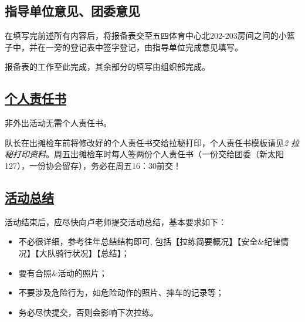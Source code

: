 \documentclass[UTF8]{ctexart}
\begin{document}
\subsection{指导单位意见、团委意见}\label{结束}

在填写完前述所有内容后，将报备表交至五四体育中心北202-203房间之间的小篮子中，并在一旁的登记表中签字登记，由指导单位完成意见填写。

报备表的工作至此完成，其余部分的填写由组织部完成。

\subsection[个人责任书]{\underline{个人责任书}}

非外出活动无需个人责任书。

队长在出摊检车前将修改好的个人责任书交给拉秘打印，个人责任书模板请见{\color{blue}\textit{2 拉秘打印资料}}。周五出摊检车时每人签两份个人责任书（一份交给团委（新太阳127），一份协会留存），务必在周五16：30前交！


\subsection[活动总结]{\underline{活动总结}}

活动结束后，应尽快向卢老师提交活动总结，基本要求如下：
\begin{itemize}[nosep,left=4em]
    \item 不必很详细，参考往年总结结构即可, 包括【拉练简要概况】【安全\&纪律情况】【大队骑行状况】【总结】；
    \item 要有合照\&活动的照片；
    \item 不要涉及危险行为，如危险动作的照片、摔车的记录等；
    \item 务必尽快提交，否则会影响下次拉练。
\end{itemize}
\end{document}
